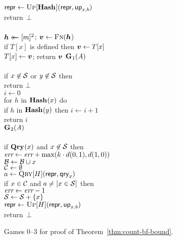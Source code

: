 \begin{figure*}
{      $\mathsf{repr} \gets \textsc{Up}[\mathbf{Hash}\hspace{0.5pt}](\mathsf{repr},\mathsf{up}_{x,b})$\\
      return~$\bot$
    \\[6pt]
    \\
      $\boldsymbol{h} \mathrel{\leftarrow\mkern-14mu\leftarrow} [m]^2$; $\boldsymbol{v} \gets \textsc{Fn}(\boldsymbol{h}$)\\
      if $T[x]$ is defined then $\boldsymbol{v} \gets T[x]$\\
      $T[x] \gets \boldsymbol{v}$;
      return $\boldsymbol{v}$
  }
  {
    \underline{$\mathbf{G}\hspace{0.5pt}_1(\mathit{A})$}\\[2pt]
    \\
      if $x \not\in \mathcal{S}$ or $y \not\in \mathcal{S}$ then\\
      \tab return $\bot$\\
      $i \gets 0$\\
      for $h$ in $\mathbf{Hash}\hspace{0.5pt}(x)$ do\\
      \tab if $h$ in $\mathbf{Hash}\hspace{0.5pt}(y)$ then $i \gets i+1$\\
      return $i$
    \\[6pt]
    \underline{$\mathbf{G}\hspace{0.5pt}_2(\mathit{A})$}\\[2pt]
    \\
      if $\mathbf{Qry}\hspace{0.5pt}(x)$ and $x \not\in \mathcal{S}$ then\\
      \tab $\textit{err} \gets \textit{err} + \max(k \cdot d(0,1), d(1,0))$\\
      $\mathcal{B} \gets \mathcal{B} \cup x$\\
      $\mathcal{C} \gets \emptyset$\\
      $a \gets \textsc{Qry}[H](\mathsf{repr}, \mathsf{qry}_x)$\\
      if $x \in \mathcal{C}$ and $a \neq [x \in \mathcal{S}]$ then\\
      \tab $\textit{err} \gets \textit{err}-1$\\
      $\mathcal{S} \gets \mathcal{S} + \{x\}$\\
      $\mathsf{repr} \gets \textsc{Up}[H](\mathsf{repr},\mathsf{up}_{x,b})$\\
      return~$\bot$
  }
  {
  }
  {
  }
  \caption{Games 0--3 for proof of Theorem~\ref{thm:count-bf-bound}.}
  \label{fig:count-bf-bound}
\end{figure*}

